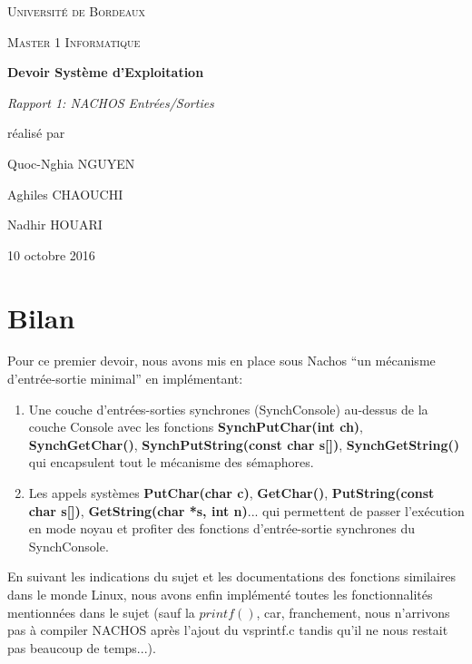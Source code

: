 \documentclass[12pt,a4paper]{article}
\newcommand{\quotes}[1]{``#1''}
\begin{document}
\begin{titlepage}
\centering
{\scshape\LARGE Université de Bordeaux \par}
{\scshape\Large Master 1 Informatique \par}
\vspace{3cm}

{\Huge\bfseries Devoir Système d'Exploitation \par}
\vspace{0.5cm}
{\Large\itshape Rapport 1: NACHOS Entrées/Sorties \par}

\vfill
réalisé par \par
Quoc-Nghia \textsc{NGUYEN} \par
Aghiles \textsc{CHAOUCHI} \par
Nadhir \textsc{HOUARI} \par
\vfill

{\large 10 octobre 2016\par}

\end{titlepage}

\section{Bilan}
Pour ce premier devoir, nous avons mis en place sous Nachos \quotes{un mécanisme d'entrée-sortie minimal} en implémentant:
\begin{enumerate}
\item Une couche d'entrées-sorties synchrones (SynchConsole) au-dessus de la couche Console avec les fonctions \textbf{SynchPutChar(int ch)}, \textbf{SynchGetChar()}, \textbf{SynchPutString(const char s[])}, \textbf{SynchGetString()} qui encapsulent tout le mécanisme des sémaphores.

\item Les appels systèmes \textbf{PutChar(char c)}, \textbf{GetChar()}, \textbf{PutString(const char s[])}, \textbf{GetString(char *s, int n)}... qui permettent de passer l'exécution en mode noyau et profiter des fonctions d'entrée-sortie synchrones du SynchConsole.
\end{enumerate}

En suivant les indications du sujet et les documentations des fonctions similaires dans le monde Linux, nous avons enfin implémenté toutes les fonctionnalités mentionnées dans le sujet (sauf la $printf()$, car, franchement, nous n'arrivons pas à compiler NACHOS après l'ajout du vsprintf.c tandis qu'il ne nous restait pas beaucoup de temps...).
\end{document}
